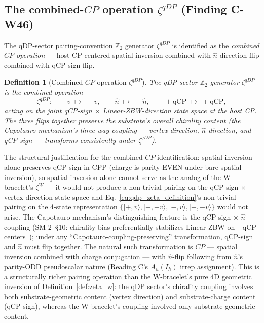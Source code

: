 \documentclass[11pt,letterpaper]{article}
\newtheorem{definition}[theorem]{Definition}
\begin{document}
\subsection{The combined-$CP$ operation $\zeta^{qDP}$ (Finding C-W46)}\label{sec:qdp_zeta_definition}

The qDP-sector pairing-convention $\mathbb{Z}_2$ generator $\zeta^{qDP}$ is identified as the \emph{combined $CP$ operation} --- host-CP-centered spatial inversion combined with $\hat{n}$-direction flip combined with qCP-sign flip.

\begin{definition}[Combined-$CP$ operation $\zeta^{qDP}$]\label{def:zeta_qdp}
The qDP-sector $\mathbb{Z}_2$ generator $\zeta^{qDP}$ is the combined operation
\begin{equation}\label{eq:qdp_zeta_definition}
\zeta^{qDP}: \qquad v \;\mapsto\; -v, \qquad \hat{n} \;\mapsto\; -\hat{n}, \qquad \pm\text{qCP} \;\mapsto\; \mp\text{qCP},
\end{equation}
acting on the joint qCP-sign $\times$ Linear-ZBW-direction state space at the host CP. The three flips together preserve the substrate's overall chirality content (the Capotauro mechanism's three-way coupling --- vertex direction, $\hat{n}$ direction, and qCP-sign --- transforms consistently under $\zeta^{qDP}$).
\end{definition}

The structural justification for the combined-$CP$ identification: spatial inversion alone preserves qCP-sign in CPP (charge is parity-EVEN under bare spatial inversion), so spatial inversion alone cannot serve as the analog of the W-bracelet's $\zeta^W$ --- it would not produce a non-trivial pairing on the qCP-sign $\times$ vertex-direction state space and Eq.~\eqref{eq:qdp_zeta_definition}'s non-trivial pairing on the 4-state representation $\{|+, v\rangle, |+, -v\rangle, |-, v\rangle, |-, -v\rangle\}$ would not arise. The Capotauro mechanism's distinguishing feature is the qCP-sign $\times$ $\hat{n}$ coupling (SM-2~\S10: chirality bias preferentially stabilizes Linear ZBW on $-$qCP centers~\cite{abshier_sm2}); under any ``Capotauro-coupling-preserving'' transformation, qCP-sign and $\hat{n}$ must flip together. The natural such transformation is $CP$ --- spatial inversion combined with charge conjugation --- with $\hat{n}$-flip following from $\hat{n}$'s parity-ODD pseudoscalar nature (Reading C's $A_u(I_h)$ irrep assignment). This is a structurally richer pairing operation than the W-bracelet's pure 4D geometric inversion of Definition~\ref{def:zeta_w}: the qDP sector's chirality coupling involves both substrate-geometric content (vertex direction) and substrate-charge content (qCP sign), whereas the W-bracelet's coupling involved only substrate-geometric content.
\end{document}
